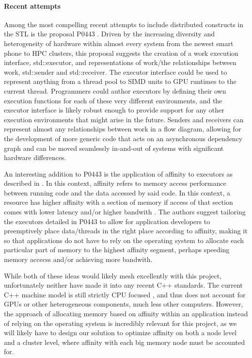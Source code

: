 \paragraph{Recent attempts}
Among the most compelling recent attempts to include distributed constructs in the STL is the proposal P0443 \cite{p0443}. Driven by the increasing diversity and heterogeneity of hardware within almost every system from the newest smart phone to HPC clusters, this proposal suggests the creation of a work execution interface, std::executor, and representations of work/the relationships between work, std::sender and std::receiver. The executor interface could be used to represent anything from a thread pool to SIMD units to GPU runtimes to the current thread. Programmers could author executors by defining their own execution functions for each of these very different environments, and the executor interface is likely robust enough to provide support for any other execution environments that might arise in the future. Senders and receivers can represent almost any relationships between work in a flow diagram, allowing for the development of more generic code that acts on an asynchronous dependency graph and can be moved seamlessly in-and-out of systems with significant hardware differences. 

An interesting addition to P0443 is the application of affinity to executors as described in \cite{towards_dist_cpp}. In this context, affinity refers to memory access performance between running code and the data accessed by said code. In this context, a resource has higher affinity with a section of memory if access of that section comes with lower latency and/or higher bandwith \cite{towards_dist_cpp}. The authors suggest tailoring the executors detailed in P0443 to allow for application developers to preemptively place data/threads in the right place according to affinity, making it so that applications do not have to rely on the operating system to allocate each particular part of memory to the highest affinity segment, perhaps speeding memory accecss and/or achieving more bandwith. 

While both of these ideas would likely mesh excellently with this project, unfortunately neither have made it into any recent C++ standards. The current C++ machine model is still strictly CPU focused \cite{towards_dist_cpp}, and thus does not account for GPUs or other heterogeneous components, much less other computers. However, the approach of allocating memory based on affinity within an application instead of relying on the operating system is incredibly relevant for this project, as we will likely have to design our solution to optimize affinity on both a node level and a cluster level, where affinity with each big memory node must be accounted for.  

